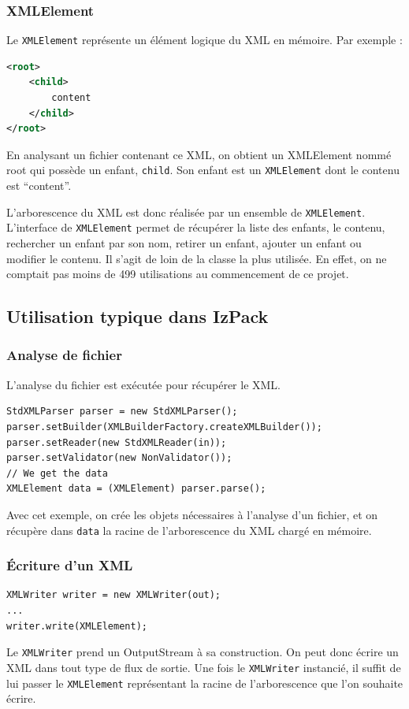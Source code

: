 \subsubsection{XMLElement}
Le \verb|XMLElement| représente un élément logique du XML en mémoire. Par exemple :
\begin{lstlisting}[language=XML]
<root>
	<child>
		content
	</child>
</root>
\end{lstlisting}
En analysant un fichier contenant ce XML, on obtient un XMLElement nommé root qui possède un enfant, \verb|child|. Son enfant est un \verb|XMLElement| dont le contenu est ``content''.

L'arborescence du XML est donc réalisée par un ensemble de \verb|XMLElement|.
L'interface de \verb|XMLElement| permet de récupérer la liste des enfants, le contenu, rechercher un enfant par son nom, retirer un enfant, ajouter un enfant ou modifier le contenu.
Il s'agit de loin de la classe la plus utilisée.
En effet, on ne comptait pas moins de 499 utilisations au commencement de ce projet.

\subsection{Utilisation typique dans IzPack}
\subsubsection{Analyse de fichier}
L'analyse du fichier est exécutée pour récupérer le XML.
\begin{lstlisting}
StdXMLParser parser = new StdXMLParser();
parser.setBuilder(XMLBuilderFactory.createXMLBuilder());
parser.setReader(new StdXMLReader(in));
parser.setValidator(new NonValidator());
// We get the data
XMLElement data = (XMLElement) parser.parse();
\end{lstlisting}
Avec cet exemple, on crée les objets nécessaires à l'analyse d'un fichier, et on récupère dans \verb|data| la racine de l'arborescence du XML chargé en mémoire.
\subsubsection{Écriture d'un XML}
\begin{lstlisting}
XMLWriter writer = new XMLWriter(out);
...
writer.write(XMLElement);
\end{lstlisting}
Le \verb|XMLWriter| prend un OutputStream à sa construction.
On peut donc écrire un XML dans tout type de flux de sortie. 
Une fois le \verb|XMLWriter| instancié, il suffit de lui passer le \verb|XMLElement| représentant la racine de l'arborescence que l'on souhaite écrire.
